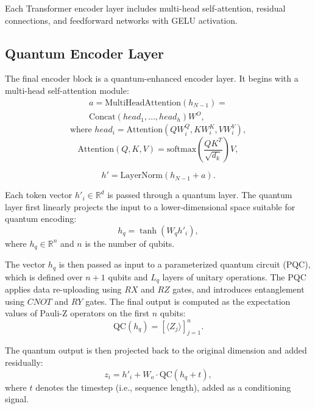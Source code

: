 \documentclass[conference]{IEEEtran}
\begin{document}
Each Transformer encoder layer includes multi-head self-attention, residual connections, and feedforward networks with GELU activation.

\subsection{Quantum Encoder Layer}

The final encoder block is a quantum-enhanced encoder layer. It begins with a multi-head self-attention module:
\begin{multline}
a = \text{MultiHeadAttention}(h_{N-1}) = \\ \text{Concat}(head_1, \ldots, head_h)W^O,
\end{multline}
\begin{equation}
\text{where } head_i = \text{Attention}(QW_i^Q, KW_i^K, VW_i^V),
\end{equation}
\begin{equation}
\text{Attention}(Q, K, V) = \text{softmax}\left(\frac{QK^T}{\sqrt{d_k}}\right)V,
\end{equation}

\begin{equation}
h' = \text{LayerNorm}(h_{N-1} + a).
\end{equation}

Each token vector $h'_i \in \mathbb{R}^d$ is passed through a quantum layer. The quantum layer first linearly projects the input to a lower-dimensional space suitable for quantum encoding:
\begin{equation}
h_q = \tanh(W_q h'_i),
\end{equation}
where $h_q \in \mathbb{R}^{n}$ and $n$ is the number of qubits.

The vector $h_q$ is then passed as input to a parameterized quantum circuit (PQC), which is defined over $n + 1$ qubits and $L_q$ layers of unitary operations. The PQC applies data re-uploading using $RX$ and $RZ$ gates, and introduces entanglement using $CNOT$ and $RY$ gates. The final output is computed as the expectation values of Pauli-Z operators on the first $n$ qubits:
\begin{equation}
\text{QC}(h_q) = \left[ \langle Z_j \rangle \right]_{j=1}^{n}.
\end{equation}

The quantum output is then projected back to the original dimension and added residually:
\begin{equation}
z_i = h'_i + W_o \cdot \text{QC}(h_q + t),
\end{equation}
where $t$ denotes the timestep (i.e., sequence length), added as a conditioning signal.
\end{document}
